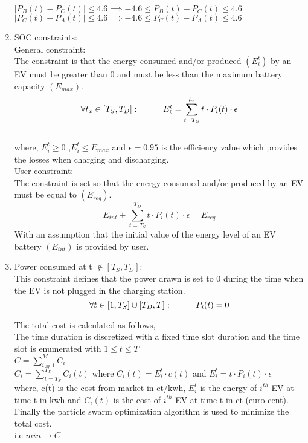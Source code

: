\documentclass{article}
\newcommand\tab[1][1cm]{\hspace*{#1}}
\begin{document}
\begin{enumerate}
    \(|P_B(t)-P_C(t)|\leq 4.6 \implies -4.6 \leq P_B(t)-P_C(t) \leq 4.6 \)\\[0.2cm]
    \(|P_C(t)-P_A(t)|\leq 4.6 \implies -4.6 \leq P_C(t)-P_A(t) \leq 4.6 \)
     \item SOC constraints: \\[0.2cm]
     General constraint: \\[0.2cm]
     The constraint is that the energy consumed and/or produced \((E_i^t)\) by an EV must be greater than 0 and must be less than the maximum battery capacity \((E_{max})\).
     \[\forall t_x \in [T_S , T_D] : \tab E_i^t = \sum_{t=T_S}^{t_x} t \cdot P_i(t)\cdot \epsilon \]\\
     where, \(E_i^t \geq 0 \) ,\( E_i^t \leq E_{max} \) and \(\epsilon = 0.95\) is the efficiency value which provides the losses when charging and discharging.\\[0.3cm]
     User constraint: \\[0.2cm]
     The constraint is set so that the energy consumed and/or produced by an EV must be equal to \((E_{req})\).
     \[ E_{int} + \sum_{t=T_S}^{T_D} t \cdot P_i(t)\cdot \epsilon = E_{req}\]
     With an assumption that the initial value of the energy level of an EV battery \((E_{int})\) is provided by user.\\
     \item Power consumed at t \( \not\in [T_S,T_D] \): \\[0.2cm]
     This constraint defines that the power drawn is set to 0 during the time when the EV is not plugged in the charging station.
     \[\forall t \in [1 , T_S] \cup [T_D , T] : \tab P_i(t) =0 \]
    
     The total cost is calculated as follows,\\[0.2cm]
     The time duration is discretized with a fixed time slot duration and the time slot is enumerated with \(1  \leq t \leq T  \)\\[0.2cm]
     \(C = \sum_{i=1}^{M} C_i \)\\[0.2cm]
     \(C_i = \sum_{t=T_S}^{T_D} C_i(t) \) \tab where \(C_i(t) = E_i^t \cdot c(t) \) and
     \(E_i^t = t \cdot P_i(t) \cdot \epsilon \)\\[0.3cm]
     where, c(t) is the cost from market in ct/kwh, \(E_i^t\) is the energy of \(i^{th}\) EV at time t in kwh and \(C_i(t)\) is the cost of \(i^{th}\) EV at time t in ct (euro cent).\\[0.2cm]
     Finally the particle swarm optimization algorithm is used to minimize the total cost.\\[0.2cm]
     i.e \( min \to C \)
   
 \end{enumerate}
\end{document}
